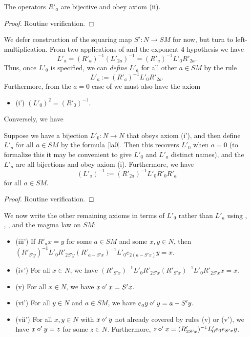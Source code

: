 \begin{lemma}\label{ra-prop}\leanok  The operators $R'_a$ are bijective and obey axiom (ii).
\end{lemma}

\begin{proof}\leanok Routine verification.
\end{proof}

We defer construction of the squaring map $S': N \to SM$ for now, but turn to left-multiplication. From two applications of  and the exponent 4 hypothesis we have
$$ L'_a = (R'_a)^{-1} (L'_{2a})^{-1} = (R'_a)^{-1} L'_0 R'_{2a}.$$
Thus, once $L'_0$ is specified, we can \emph{define} $L'_a$ for all other $a \in SM$ by the rule
\begin{equation}\label{la0}
  L'_a := (R'_a)^{-1} L'_0 R'_{2a}.
\end{equation}
Furthermore, from the $a=0$ case of  we must also have the axiom
\begin{itemize}
  \item (i') $(L'_0)^2 = (R'_0)^{-1}$.
\end{itemize}

Conversely, we have

\begin{lemma}\label{l0-la}\leanok  Suppose we have a bijection $L'_0: N \to N$ that obeys axiom (i'), and then define $L'_a$ for all $a \in SM$ by the formula \eqref{la0}.  Then this recovers $L'_0$ when $a=0$ (to formalize this it may be convenient to give $L'_0$ and $L'_a$ distinct names), and the $L'_a$ are all bijections and obey axiom (i).  Furthermore, we have
\begin{equation}\label{la1}
  (L'_a)^{-1} := (R'_{2a})^{-1} L'_0 R'_0 R'_{a}
\end{equation}
for all $a \in SM$.
\end{lemma}

\begin{proof}\leanok Routine verification.
\end{proof}

We now write the other remaining axioms in terms of $L'_0$ rather than $L'_a$ using , , , and the magma law on $SM$:
\begin{itemize}
\item (iii')  If $R'_a x = y$ for some $a \in SM$ and some $x,y \in N$, then $(R'_{S'y})^{-1} L'_0 R'_{2S'y} (R'_{a - S'x})^{-1} L'_0 e_{2(a - S'x)} y = x$.
\item (iv')  For all $x \in N$, we have $(R'_{S'x})^{-1} L'_0 R'_{2S'x} (R'_{S'x})^{-1} L'_0 R'_{2S'x} x = x$.
\item (v)  For all $x \in N$, we have $x \diamond' x = S'x$.
\item (vi')  For all $y \in N$ and $a \in SM$, we have $e_a y \diamond' y = a - S'y$.
\item (vii')  For all $x,y \in N$ with $x \diamond' y$ not already covered by rules (v) or (v'), we have $x \diamond' y = z$ for some $z \in N$.  Furthermore, $z \diamond' x = (R'_{2S'x})^{-1} L'_0 e_0 e_{S'x} y$.
\end{itemize}

